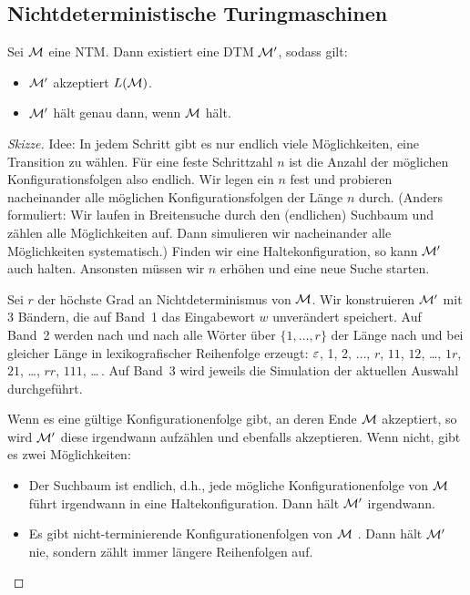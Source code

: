 \subsection{Nichtdeterministische Turingmaschinen}

\begin{Satz}\label{satz:Ntm2Dtm}
	Sei $\mathcal{M}$ eine \ac{NTM}.
	Dann existiert eine \ac{DTM} $\mathcal{M}'$, sodass gilt:
	\begin{itemize}
	\item $\mathcal{M}'$ akzeptiert $L(\mathcal{M})$.
	\item $\mathcal{M}'$ hält genau dann, wenn $\mathcal{M}$ hält.
	\qedhere
	\end{itemize}
\end{Satz}

\begin{proof}[Skizze]
Idee: In jedem Schritt gibt es nur endlich viele Möglichkeiten, eine Transition zu wählen.
Für eine feste Schrittzahl $n$ ist die Anzahl der möglichen Konfigurationsfolgen also endlich.
Wir legen ein $n$ fest und probieren nacheinander alle möglichen Konfigurationsfolgen der Länge $n$ durch.
(Anders formuliert: Wir laufen in Breitensuche durch den (endlichen) Suchbaum und zählen alle Möglichkeiten auf.
Dann simulieren wir nacheinander alle Möglichkeiten systematisch.)
Finden wir eine Haltekonfiguration, so kann $\mathcal{M}'$ auch halten.
Ansonsten müssen wir $n$ erhöhen und eine neue Suche starten.

Sei $r$ der höchste Grad an Nichtdeterminismus von $\mathcal{M}$.
Wir konstruieren $\mathcal{M}'$ mit 3 Bändern, die auf Band~1 das Eingabewort $w$ unverändert speichert.
Auf Band~2 werden nach und nach alle Wörter über $\{1, \dots, r\}$ der Länge nach und bei gleicher Länge in lexikografischer Reihenfolge erzeugt: $\varepsilon$, 1, 2, $\dots$, $r$, $11$, $12$, \dots, $1r$, $21$, \dots, $rr$, $111$, \dots\,.
Auf Band~3 wird jeweils die Simulation der aktuellen Auswahl durchgeführt.

Wenn es eine gültige Konfigurationenfolge gibt, an deren Ende $\mathcal{M}$ akzeptiert, so wird $\mathcal{M}'$ diese irgendwann aufzählen und ebenfalls akzeptieren.
Wenn nicht, gibt es zwei Möglichkeiten:
%
\begin{itemize}
 \item Der Suchbaum ist endlich, d.h., jede mögliche Konfigurationenfolge von $\mathcal{M}$ führt irgendwann in eine Haltekonfiguration.
 Dann hält $\mathcal{M}'$ irgendwann.
 \item Es gibt nicht-terminierende Konfigurationenfolgen von $\mathcal{M}$ .
 Dann hält $\mathcal{M}'$ nie, sondern zählt immer längere Reihenfolgen auf.
 \qedhere
\end{itemize}
\end{proof}

